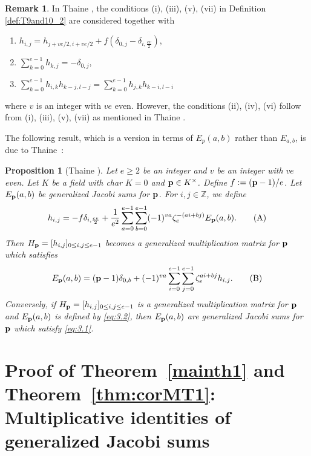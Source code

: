 \documentclass[a4paper, 11pt]{amsart}
\newcommand{\Z}{\mathbb Z}
\theoremstyle{plain}
\newtheorem{prop}[thm]{Proposition}
\theoremstyle{definition}
\newtheorem{remark}[thm]{Remark}
\numberwithin{equation}{section}
\begin{document}
\begin{remark}\label{rem:DefGenJacobi}
In Thaine \cite[Proposition~9 and Proposition~10]{Tha04}, 
the conditions {\rm (i), (iii), (v), (vii)} in Definition \ref{def:T9and10_2} 
are considered together with
\begin{enumerate}
\item[(ii)] $h_{i,j}=h_{j+ve/2,i+ve/2} + f(\delta_{0,j}-\delta_{i,\frac{ev}{2}})$,
\item[(iv)] $\sum^{e-1}_{k=0}h_{k,j}=-\delta_{0,j}$,
\item[(vi)] $\sum^{e-1}_{k=0}h_{i,k}h_{k-j,l-j}
=\sum^{e-1}_{k=0}h_{j,k}h_{k-i,l-i}$
\end{enumerate}
where $v$ is an integer with $ve$ even. 
However, the conditions {\rm (ii), (iv), (vi)} follow from
{\rm (i), (iii), (v), (vii)} 
as mentioned in Thaine \cite[page 271, Observation of Proposition~9]{Tha04}. 
\end{remark}

The following result, which is a version in terms of $E_p(a,b)$ rather than $E_{a,b}$, is due to Thaine~\cite{Tha04}:

\begin{prop}[{Thaine \cite[Proposition~9 and Proposition~10]{Tha04}}]\label{prop:T9andT10}
Let $e \geq 2$ be an integer and $v$ be an integer with $ve$ even. 
Let $K$ be a field with char $K=0$ and ${\bf p}\in K^{\times}$. 
Define $f:=({\bf p}-1)/e$. 
Let $E_{\bf p}(a,b)$ be generalized Jacobi sums for ${\bf p}$. 
For $i,j \in \Z$, we define
\begin{equation}\label{eq:3.1}
h_{i,j}=-f\delta_{i,\frac{ev}{2}}+\frac{1}{e^2}\sum^{e-1}_{a=0} \sum^{e-1}_{b=0} (-1)^{va} \zeta_e^{-(ai+bj)}E_{\bf p}(a,b). \tag{A}
\end{equation}
Then $H_{\bf p}=[h_{i,j}]_{0\leq i,j\leq e-1}$ 
becomes a generalized multiplication matrix for ${\bf p}$
which satisfies 
\begin{equation}\label{eq:3.2}
E_{\bf p}(a,b)=({\bf p}-1)\delta_{0,b} + (-1)^{va}\sum^{e-1}_{i=0} \sum^{e-1}_{j=0} \zeta_e^{ai+bj}h_{i,j}. \tag{B}
\end{equation}
Conversely, if $H_{{\bf p}}=[h_{i,j}]_{0\leq i,j\leq e-1}$ 
is a generalized multiplication matrix for ${\bf p}$ 
and $E_{\bf p}(a,b)$ is defined by \eqref{eq:3.2}, then 
$E_{\bf p}(a,b)$ are generalized Jacobi sums for ${\bf p}$ 
which satisfy \eqref{eq:3.1}. 
\end{prop}

\section{{Proof of Theorem~\ref{mainth1}} and {Theorem~\ref{thm:corMT1}: Multiplicative identities of generalized Jacobi sums}}\label{S3}
\end{document}
